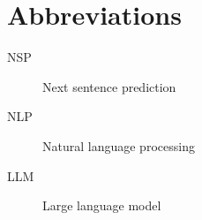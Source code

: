 %
%
%
%

\section{Abbreviations}
\begin{description}
	\item [NSP] Next sentence prediction
	\item [NLP] Natural language processing
	\item [LLM] Large language model
\end{description}
